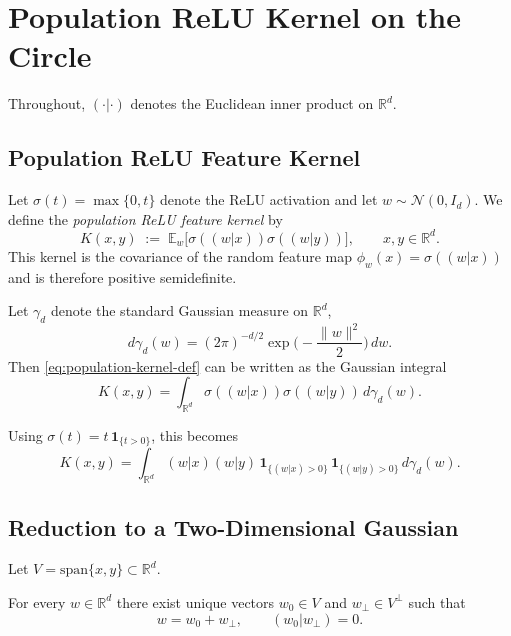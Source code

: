 \section{Population ReLU Kernel on the Circle}

Throughout, $(\cdot|\cdot)$ denotes the Euclidean inner product on $\mathbb R^d$.

\subsection{Population ReLU Feature Kernel}

Let $\sigma(t)=\max\{0,t\}$ denote the ReLU activation and let
$w\sim\mathcal N(0,I_d)$.
We define the \emph{population ReLU feature kernel} by
\begin{equation}
	\label{eq:population-kernel-def}
	K(x,y)
	\;:=\;
	\mathbb E_w\big[\sigma((w|x))\sigma((w|y))\big],
	\qquad x,y\in\mathbb R^d.
\end{equation}
This kernel is the covariance of the random feature map
$\phi_w(x)=\sigma((w|x))$ and is therefore positive semidefinite.

Let $\gamma_d$ denote the standard Gaussian measure on $\mathbb R^d$,
\[
	d\gamma_d(w)
	=
	(2\pi)^{-d/2}\exp\!\Big(-\frac{\|w\|^2}{2}\Big)\,dw.
\]
Then \eqref{eq:population-kernel-def} can be written as the Gaussian integral
\begin{equation}
	\label{eq:population-kernel-integral}
	K(x,y)
	=
	\int_{\mathbb R^d}
	\sigma((w|x))\sigma((w|y))\,
	d\gamma_d(w).
\end{equation}

Using $\sigma(t)=t\,\mathbf 1_{\{t>0\}}$, this becomes
\begin{equation}
	\label{eq:relu-indicator-integral}
	K(x,y)
	=
	\int_{\mathbb R^d}
	(w|x)(w|y)\,
	\mathbf 1_{\{(w|x)>0\}}\,
	\mathbf 1_{\{(w|y)>0\}}\,
	d\gamma_d(w).
\end{equation}

\subsection{Reduction to a Two-Dimensional Gaussian}

Let $V=\mathrm{span}\{x,y\}\subset\mathbb R^d$.

\begin{lemma}
	\label{lem:orth-decomp}
	For every $w\in\mathbb R^d$ there exist unique vectors
	$w_0\in V$ and $w_\perp\in V^\perp$ such that
	\[
		w = w_0 + w_\perp,
		\qquad
		(w_0|w_\perp)=0.
	\]
\end{lemma}

